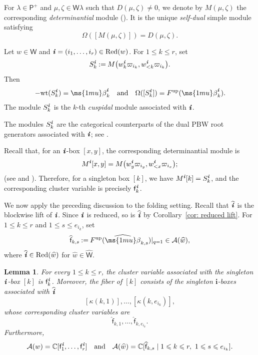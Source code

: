 \documentclass[12pt, leqno]{amsart}
\numberwithin{equation}{section}
\theoremstyle{plain}
\newtheorem{lemma}{Lemma}[section]
\theoremstyle{definition}
\renewcommand{\le}{\leqslant}
\newcommand{\seteq}{\mathbin{:=}}
\newcommand{\C}{\mathbb{C}}
\newcommand{\be}{{\ms{1mu}\beta}}
\newcommand{\wt}{{\rm wt}}
\newcommand{\up}{{\rm up}}
\newcommand{\ii}{ \textbf{\textit{i}}}
\newcommand{\hw}{\widehat{w}}
\newcommand{\hbe}{\widehat{\be}}
\newcommand{\hii}{{\widehat{\ii}}}
\newcommand{\sfP}{\mathsf{P}}
\newcommand{\sfW}{\mathsf{W}}
\newcommand{\sff}{\mathsf{f}}
\newcommand{\hsff}{\widehat{\sff}}
\newcommand{\hsfW}{\widehat{\sfW}}
\newcommand{\bfi}{\mathbf{i}}
\newcommand{\calA}{\mathcal{A}}
\newcommand{\wl}{\sfP}
\newcommand{\weyl}{\sfW}
\newcommand{\qtq}[1][{and}]{\quad\text{{#1}}\quad}
\newcommand{\Red}{\mathrm{Red}}
\begin{document}
For $\lambda\in\wl^+$ and $\mu,\zeta\in\weyl\lambda$ such that
$D(\mu,\zeta)\ne0$, we denote by $M(\mu,\zeta)$ the corresponding
\emph{determinantial} module (\cite{KKOP18}).  It is the unique \emph{self-dual} simple module satisfying
\[
\Omega([M(\mu,\zeta)])=D(\mu,\zeta).
\]

Let $w\in\weyl$ and $\ii=(i_1,\ldots,i_r)\in\Red(w)$.
For $1\le k\le r$, set
\[
S_k^\ii \seteq M\bigl(w_k^\ii\varpi_{i_k},w_{<k}^\ii\varpi_{i_k}\bigr).
\]
Then
\[
-\wt(S_k^\ii)=\be_k^\ii \qtq \Omega([S_k^\ii]) = F^{\up}(\be_k^\ii).
\]
The module $S_k^\ii$ is the $k$-th \emph{cuspidal} module associated with $\ii$.

The modules $S_k^\ii$ are the categorical counterparts of the dual
PBW root generators associated with $\ii$; see
\cite[Section~5.1]{KK24}.


Recall that, for an $\ii$-box $[x,y]$, the corresponding
determinantial module is
\[
M^\ii[x,y] = M\bigl(w_y^\ii\varpi_{i_y}, w_{<x}^\ii\varpi_{i_x}\bigr);
\]
(see \cite{KKKO18} and \cite[Section~5.1]{KK24}).  Therefore, for a singleton box
$[k]$, we have $M^\ii[k]=S_k^\ii$, and the corresponding cluster variable is precisely $\sff_k^\ii$.

We now apply the preceding discussion to the folding setting.
 Recall that $\hii$ is the blockwise lift of $\ii$.{}  Since $\ii$ is
reduced, so is $\hii$ by Corollary~\ref{cor: reduced lift}.  For $1\le k\le r$ and
$1\le s\le e_{i_k}$, set
\[
\hsff_{k,s} \seteq F^{\up}(\hbe_{k,s})|_{q=1} \in \calA(\hw),
\]
where $\hii\in\Red(\hw)$ for $\hw\in\hsfW$.

\begin{lemma}\label{lem: singleton PBW generators}
For every $1\le k\le r$, the cluster variable associated with the
singleton $\ii$-box $[k]$ is $\sff_k^\ii$.
Moreover, the fiber of $[k]$ consists of the singleton
$\bfi$-boxes associated with $\hii$
\[
[\kappa(k,1)],\ldots, [\kappa(k,e_{i_k})],
\]
whose corresponding cluster variables are
\[
\hsff_{k,1},\ldots,\hsff_{k,e_{i_k}}.
\]
Furthermore,
\[
\calA(w)=\C[\sff_1^\ii,\ldots,\sff_r^\ii] \qtq \calA(\hw) = \C[\hsff_{k,s}\mid 1\le k\le r,\ 1\le s\le e_{i_k}].
\]
\end{lemma}
\end{document}
